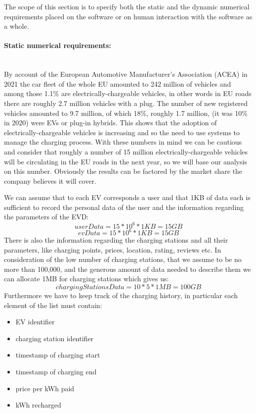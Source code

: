 The scope of this section is to specify both the static and the dynamic numerical requirements placed on the software or on human
interaction with the software as a whole.
\paragraph{Static numerical requirements:}\mbox{}\\
By account of the European Automotive Manufacturer's Association (ACEA) in 2021 the car fleet of the whole EU amounted to 242 million of vehicles and among those 1.1\% are electrically-chargeable vehicles, in other words in EU roads there are roughly 2.7 million vehicles with a plug. The number of new registered vehicles amounted to 9.7 million, of which 18\%, roughly 1.7 million, (it was 10\% in 2020) were EVs or plug-in hybrids. This shows that the adoption of electrically-chargeable vehicles is increasing and so the need to use systems to manage the charging process. With these numbers in mind we can be cautious and consider that roughly a number of 15 million electrically-chargeable vehicles will be circulating in the EU roads in the next year, so we will base our analysis on this number. Obviously the results can be factored by the market share the company believes it will cover.
\par
We can assume that to each EV corresponds a user and that 1KB of data each is sufficient to record the personal data of the user and the information regarding the parameters of the EVD:
\[ userData = 15 * 10^6 * 1KB = 15 GB \]
\[ evData = 15 * 10^6 * 1KB = 15 GB \]
There is also the information regarding the charging stations and all their parameters, like charging points, prices, location, rating, reviews etc. In consideration of the low number of charging stations, that we assume to be no more than 100,000, and the generous amount of data needed to describe them we can allocate 1MB for charging stations which gives us:
\[chargingStationsData = 10*5 * 1MB = 100 GB\]
Furthermore we have to keep track of the charging history, in particular each element of the list must contain:
\begin{itemize}
    \item EV identifier
    \item charging station identifier
    \item timestamp of charging start
    \item timestamp of charging end
    \item price per kWh paid
    \item kWh recharged
\end{itemize}

